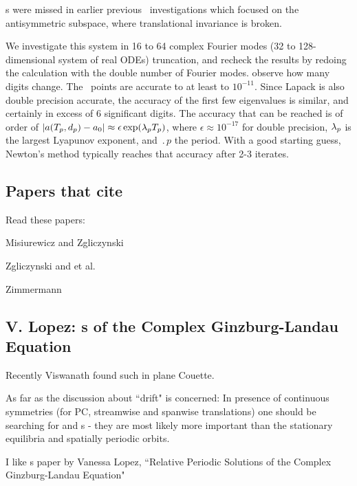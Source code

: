 {\Rpo s} were missed in earlier
previous \KS\ investigations%
which focused on the antisymmetric subspace, where translational invariance
is broken.

 We investigate this system in 16 to 64 complex Fourier modes (32 to
128-dimensional system of real ODEs) truncation, and recheck the results
by redoing the calculation with the double number of Fourier modes. %
observe how many digits change. The \eqv\ points are accurate to at least
to $10^{-11}$. Since Lapack is also double precision accurate, the
accuracy of the first few eigenvalues is similar, and certainly in excess
of 6 significant digits. %
The accuracy that can be reached is of order of
$|a({T_{p}},d_p) - a_0|
 \approx \epsilon \exp(\lambda_p {T_{p}})$,
 where $\epsilon \approx 10^{-17}$ for double precision, $\lambda_p$ is
the largest Lyapunov exponent, and $\period{p}$ the period.  With a good
starting guess, Newton's method typically reaches that accuracy after 2-3
iterates.


\subsection*{Papers that cite }

Read these papers:

Misiurewicz and Zgliczynski

Zgliczynski and et al.

Zimmermann

\subsection*{V. Lopez:
        {\Rpo s} of the Complex Ginzburg-Landau Equation}

        Recently
 Viswanath found such in plane Couette.

As far as the discussion about ``drift" is concerned:
In presence of continuous symmetries (for PC, streamwise and
spanwise translations) one should be searching for
{\reqva} and
{\rpo s} - they are most likely more important than
the stationary equilibria and spatially periodic orbits.

I like {\rpo s} paper by
Vanessa Lopez,
``Relative Periodic Solutions of the Complex Ginzburg-Landau Equation"

